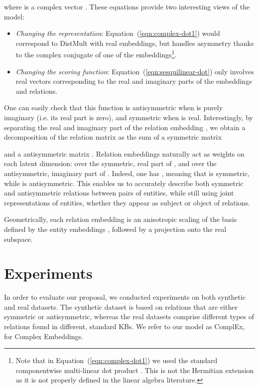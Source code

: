 \documentclass{article}
\begin{document}
where  is a complex vector . These equations provide two interesting views of the model:
\begin{itemize}
    \item \emph{Changing the representation}: Equation~(\ref{eqn:complex-dot1}) would correspond to DistMult with real embeddings, but handles asymmetry thanks to the complex conjugate of one of the embeddings\footnote{Note that in Equation~(\ref{eqn:complex-dot1}) we used the standard componentwise multi-linear dot product . This is not 
    the Hermitian extension as it is not properly defined in the linear algebra literature.}.
    \item  \emph{Changing the scoring function}: Equation~(\ref{eqn:sesquilinear-dot}) only involves real vectors corresponding to the real and imaginary parts of the embeddings and relations.\end{itemize}



One can easily check that this function is antisymmetric when  is purely imaginary (i.e. its real part is zero), and symmetric when  is real. 
Interestingly, by separating the real and imaginary part of the relation embedding ,
we obtain a decomposition of the relation matrix  as the sum of a symmetric matrix

and a antisymmetric matrix
. 
Relation embeddings naturally act as weights on each latent dimension:  over the symmetric, real part of , and  over the antisymmetric, imaginary part
of . Indeed, one has , meaning that  is symmetric, while  is antisymmetric. This enables us to accurately describe both symmetric and antisymmetric relations between pairs of entities, while still using joint representations of entities, whether they appear as subject or object of relations. 

Geometrically, each relation embedding  is an anisotropic
scaling of the basis defined by the entity embeddings , followed by a projection
onto the real subspace.














\section{Experiments}
\label{sec:expe}

In order to evaluate our proposal, we conducted experiments on both synthetic and real datasets. The synthetic dataset is based on relations that are either symmetric or antisymmetric, whereas the real datasets comprise different types of relations found in different, standard KBs. We refer to our model as ComplEx, for Complex Embeddings.
\end{document}
